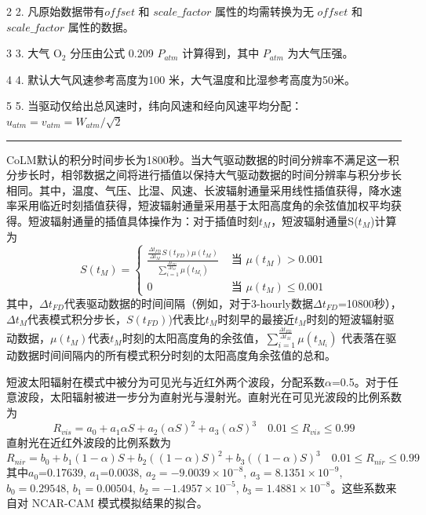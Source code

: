 \begin{landscape}
\begin{tablenotes}
\item[2] 2. 凡原始数据带有$offset$ 和 $scale\_{factor}$ 属性的均需转换为无 $offset$ 和$scale\_{factor}$ 属性的数据。

\item[3] 3. 大气 $\mathrm{O_2}$ 分压由公式 0.209 $P_{atm}$ 计算得到，其中 $P_{atm}$ 为大气压强。

\item[4] 4. 默认大气风速参考高度为100 米，大气温度和比湿参考高度为50米。

\item[5] 5. 当驱动仅给出总风速时，纬向风速和经向风速平均分配：$u_{atm}=v_{atm}=W_{atm}/\sqrt2$

\end{tablenotes}
\hrule height 1pt
\end{landscape}





CoLM默认的积分时间步长为1800秒。当大气驱动数据的时间分辨率不满足这一积分步长时，相邻数据之间将进行插值以保持大气驱动数据的时间分辨率与积分步长相同。其中，温度、气压、比湿、风速、长波辐射通量采用线性插值获得，降水速率采用临近时刻插值获得，短波辐射通量采用基于太阳高度角的余弦值加权平均获得。短波辐射通量的插值具体操作为：对于插值时刻$t_M$，短波辐射通量S($t_M$)计算为
\begin{equation}\label{t_M}
S\left(t_{M}\right)=\left\{\begin{array}{ll}\frac{\frac{\Delta t_{FD}}{\Delta t_{M}} S\left(t_{F D}\right) \mu\left(t_{M}\right)}{\sum_{i=1}^{\frac{\Delta t_{FD}}{\Delta t_{M}}} \mu\left(t_{M_{i}}\right)} & \text { 当 } \mu\left(t_{M}\right)>0.001 \\ 0 & \text { 当 } \mu\left(t_{M}\right) \leq 0.001\end{array}\right.
\end{equation}
其中，$\Delta t_{FD}$代表驱动数据的时间间隔（例如，对于3-hourly数据$\Delta t_{FD}$=10800秒），$\Delta t_{M}$代表模式积分步长，$S(t_{FD})$)代表比$t_M$时刻早的最接近$t_M$时刻的短波辐射驱动数据，$\mu\left(t_M\right)$代表$t_M$时刻的太阳高度角的余弦值，$
\sum_{i=1}^{\frac{\Delta t_{F D}}{\Delta t_{M}}} \mu\left(t_{M_{i}}\right)$
代表落在驱动数据时间间隔内的所有模式积分时刻的太阳高度角余弦值的总和。

短波太阳辐射在模式中被分为可见光与近红外两个波段，分配系数$\alpha$=0.5。对于任意波段，太阳辐射被进一步分为直射光与漫射光。直射光在可见光波段的比例系数为
\begin{equation}\label{R_vis}
R_{vis}=a_{0}+a_{1} \alpha S+a_{2}(\alpha S)^{2}+a_{3}(\alpha S)^{3} \quad 0.01 \leq R_{vis} \leq 0.99
\end{equation}
直射光在近红外波段的比例系数为
\begin{equation}
R_{nir}=b_{0}+b_{1}(1-\alpha) S+b_{2}((1-\alpha) S)^{2}+b_{3}((1-\alpha) S)^{3} \quad 0.01 \leq R_{nir} \leq 0.99
\end{equation}
其中$a_0$=0.17639, $a_1$=0.0038, $a_2=-9.0039\times{10}^{-8}$, $a_3=8.1351\times10^{-9}$, $b_0=0.29548$, $b_1=0.00504$, $b_2=-1.4957\times10^{-5}$, $b_3=1.4881\times10^{-8}$。这些系数来自对 NCAR-CAM 模式模拟结果的拟合。

